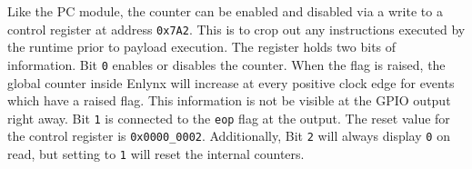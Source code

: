 \documentclass[../bachelor_paper.tex]{subfiles}
\begin{document}
Like the \ac{PC} module, the counter can be enabled and disabled via a write to a control register at address \texttt{0x7A2}. This is to crop out any instructions executed by the runtime prior to payload execution. The register holds two bits of information. Bit \texttt{0} enables or disables the counter. When the flag is raised, the global counter inside Enlynx will increase at every positive clock edge for events which have a raised flag. This information is not be visible at the GPIO output right away. Bit \texttt{1} is connected to the \texttt{eop} flag at the output. The reset value for the control register is \texttt{0x0000\_0002}. Additionally, Bit \texttt{2} will always display \texttt{0} on read, but setting to \texttt{1} will reset the internal counters.

\begin{table}
    \centering
    \bigskip


\end{table}
\end{document}
